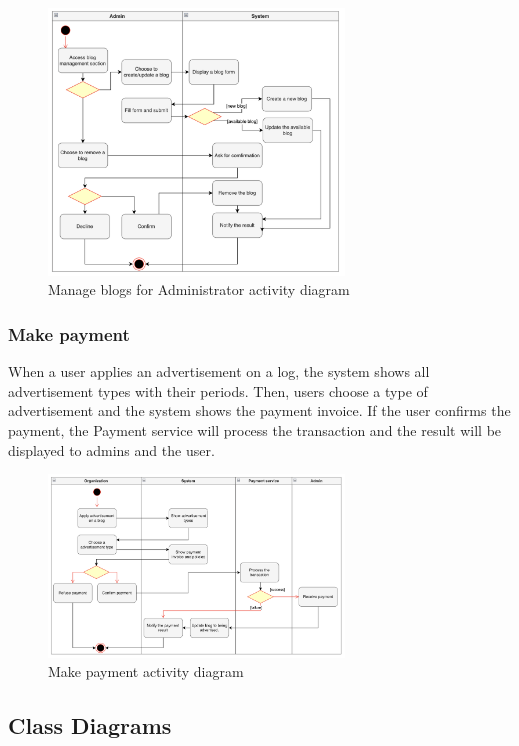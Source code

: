 \begin {figure}[H]
\centering
\includegraphics[width=0.7\textwidth]{Figures/manage_blog_admin.png}
\caption{Manage blogs for Administrator activity diagram}
\label{fig:manage-blog-admin}
\end{figure}

\subsubsection{Make payment}

When a user applies an advertisement on a log, the system shows all advertisement types with their periods. Then, users choose a type of advertisement and the system shows the payment invoice. If the user confirms the payment, the Payment service will process the transaction and the result will be displayed to admins and the user.

\begin {figure}[H]
\centering
\includegraphics[width=0.7\textwidth]{Figures/payment.png}
\caption{Make payment activity diagram}
\label{fig:make-payment}
\end{figure}

\subsection{Class Diagrams}

